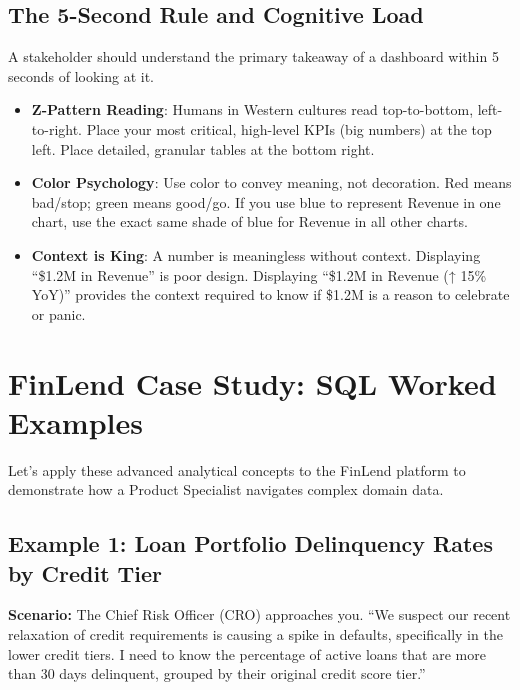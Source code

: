 \subsection{The 5-Second Rule and Cognitive
Load}\label{the-5-second-rule-and-cognitive-load}

A stakeholder should understand the primary takeaway of a dashboard
within 5 seconds of looking at it.

\begin{itemize}
\tightlist
\item
  \textbf{Z-Pattern Reading}: Humans in Western cultures read
  top-to-bottom, left-to-right. Place your most critical, high-level
  KPIs (big numbers) at the top left. Place detailed, granular tables at
  the bottom right.
\item
  \textbf{Color Psychology}: Use color to convey meaning, not
  decoration. Red means bad/stop; green means good/go. If you use blue
  to represent Revenue in one chart, use the exact same shade of blue
  for Revenue in all other charts.
\item
  \textbf{Context is King}: A number is meaningless without context.
  Displaying ``\$1.2M in Revenue'' is poor design. Displaying ``\$1.2M
  in Revenue (↑ 15\% YoY)'' provides the context required to know if
  \$1.2M is a reason to celebrate or panic.
\end{itemize}

\bigskip

\section{FinLend Case Study: SQL Worked
Examples}\label{finlend-case-study-sql-worked-examples}

Let's apply these advanced analytical concepts to the FinLend platform
to demonstrate how a Product Specialist navigates complex domain data.

\subsection{Example 1: Loan Portfolio Delinquency Rates by Credit
Tier}\label{example-1-loan-portfolio-delinquency-rates-by-credit-tier}

\textbf{Scenario:} The Chief Risk Officer (CRO) approaches you. ``We
suspect our recent relaxation of credit requirements is causing a spike
in defaults, specifically in the lower credit tiers. I need to know the
percentage of active loans that are more than 30 days delinquent,
grouped by their original credit score tier.''

